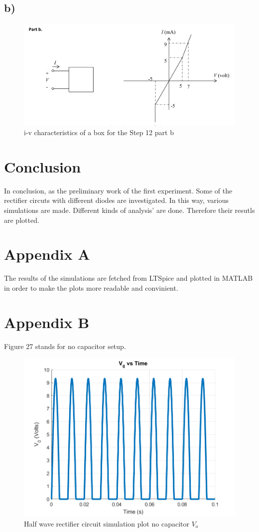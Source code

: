 \documentclass[letterpaper,12pt]{article}
\begin{document}
\subsection{b)}
\begin{figure}[H]
    \centering
   \includegraphics[width=1\textwidth]{12_2.png}
   \caption{i-v characteristics of a box for the Step 12 part b}
\end{figure} 
\fi
\section{Conclusion}
In conclusion, as the preliminary work of the first experiment. Some of the rectifier circuts with different diodes are investigated. In this way, various simulations are made. Different kinds of analysis' are done. Therefore their resutls are plotted.
\section*{Appendix A}
The results of the simulations are fetched from LTSpice and plotted in MATLAB in order to make the plots more readable and convinient.
\section*{Appendix B}
Figure 27 stands for no capacitor setup.
\begin{figure}[H]
    \centering
   \includegraphics[width=1\textwidth]{6_0F.png}
   \caption{Half wave rectifier circuit simulation plot no capacitor \(V_o\) }
\end{figure} 
\end{document}

